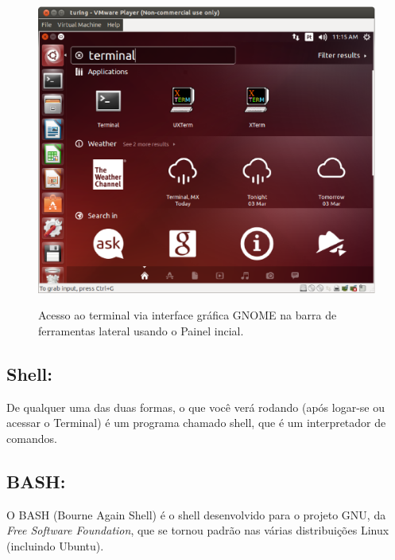\begin{refsection}
  \begin{figure}[H]
      {\includegraphics[scale=0.35]{figures/tut1/terminal2.eps}}
      {\caption[\textit{Acesso ao terminal via interface gráfica GNOME usando o Painel incial}]{Acesso ao terminal via interface gráfica GNOME na barra de ferramentas lateral  usando o Painel incial.}\label{tut1:fig:terminal2}}
  \end{figure}


\subsection{Shell:}\label{tut1:text_mode:commands:shell}
 De qualquer uma das duas formas, o que você verá rodando (após logar-se ou acessar o Terminal) é um programa chamado shell, que é um interpretador de comandos.\\
 \subsection{BASH:}\label{tut1:text_mode:commands:bash}
O BASH (Bourne Again Shell) é o shell desenvolvido para o projeto GNU, da \textit{Free Software Foundation}, que se tornou padrão nas várias distribuições Linux (incluindo Ubuntu).\\


\end{refsection}
